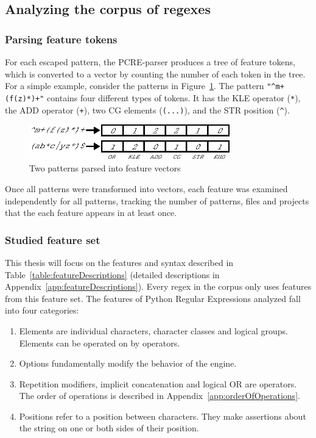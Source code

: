 \subsection{Analyzing the corpus of regexes}
\label{sec:corpusAnalyzing}

\subsubsection{Parsing feature tokens}
For each escaped pattern, the PCRE-parser produces a tree of feature tokens, which is converted to a vector by counting the number of each token in the tree.  For a simple example, consider the patterns in Figure~\ref{fig:featureParsing}.  The pattern \verb!"^m+(f(z)*)+"! contains four different types of tokens. It has the KLE operator (\verb!*!), the ADD operator (\verb!+!), two CG elements (\verb!(...)!), and the STR position (\verb!^!).

\begin{figure}[hb]
\centering
\includegraphics[height=0.6in]{nontex/illustrations/featureParsing.eps}
\caption{Two patterns parsed into feature vectors}
\label{fig:featureParsing}
\vspace{-12pt}
\end{figure}

Once all patterns were transformed into vectors, each feature was examined independently for all patterns, tracking the number of patterns, files and projects that the each feature appears in at least once.

\subsubsection{Studied feature set}



This thesis will focus on the features and syntax described in Table~\ref{table:featureDescriptions} (detailed descriptions in Appendix~\ref{app:featureDescriptions}).  Every regex in the corpus only uses features from this feature set. The features of Python Regular Expressions analyzed fall into four categories:

\begin{enumerate} \itemsep -1pt
\item{Elements are individual characters, character classes and logical groups.  Elements can be operated on by operators.}
\item{Options fundamentally modify the behavior of the engine.}
\item{Repetition modifiers, implicit concatenation and logical OR are operators. The order of operations is described in Appendix~\ref{app:orderOfOperations}}.
\item{Positions refer to a position between characters.  They make assertions about the string on one or both sides of their position.}
\end{enumerate}

